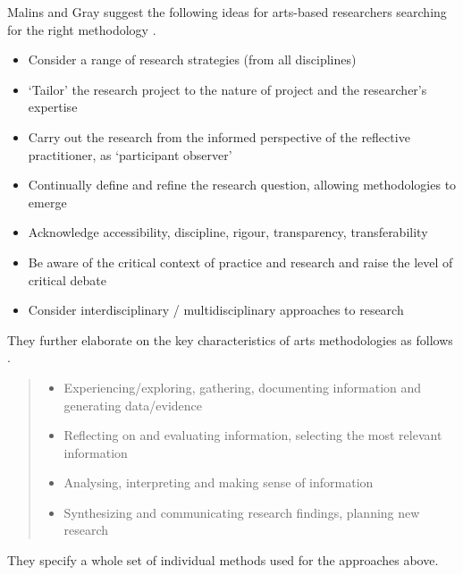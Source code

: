 \documentclass[11pt]{thesis} %
\begin{document}
Malins and Gray suggest the following ideas for arts-based researchers searching for the right methodology \citeyear{Malins1995}.

\begin{itemize}
  \item Consider a range of research strategies (from all disciplines)
  \item `Tailor' the research project to the nature of project and the researcher's expertise
  \item Carry out the research from the informed perspective of the reflective practitioner, as `participant observer'
  \item Continually define and refine the research question, allowing methodologies to emerge
  \item Acknowledge accessibility, discipline, rigour, transparency, transferability
  \item Be aware of the critical context of practice and research and raise the level of critical debate
  \item Consider interdisciplinary / multidisciplinary approaches to research
\end{itemize}

They further elaborate on the key characteristics of arts methodologies as follows \autocite{Gray2004}.

\begin{quotation}
\begin{itemize}
  \item Experiencing/exploring, gathering, documenting information and generating data/evidence
  \item Reflecting on and evaluating information, selecting the most relevant information
  \item Analysing, interpreting and making sense of information
  \item Synthesizing and communicating research findings, planning new research
\end{itemize}
\end{quotation}

They specify a whole set of individual methods used for the approaches above.
\end{document}
